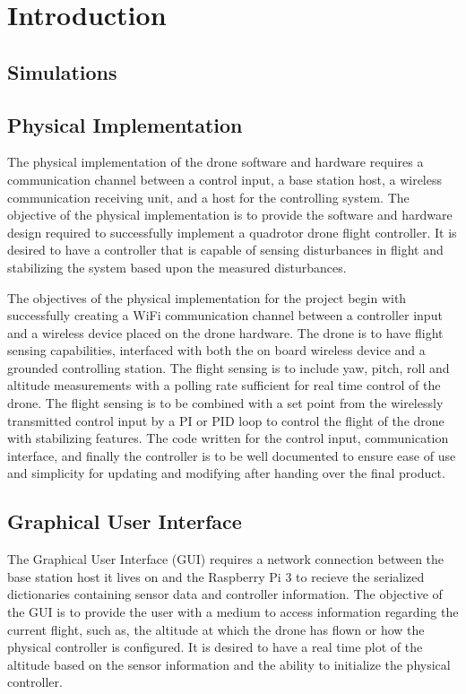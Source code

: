 
\section{Introduction}
\subsection{Simulations}

\subsection{Physical Implementation}


The physical implementation of the drone software and hardware requires a communication channel between a control input, a base station host, a wireless communication receiving unit, and a host for the controlling system. The objective of the physical implementation is to provide the software and hardware design required to successfully implement a quadrotor drone flight controller. It is desired to have a controller that is capable of sensing disturbances in flight and stabilizing the system based upon the measured disturbances.

The objectives of the physical implementation for the project begin with successfully creating a WiFi communication channel between a controller input and a wireless device placed on the drone hardware. The drone is to have flight sensing capabilities, interfaced with both the on board wireless device and a grounded controlling station. The flight sensing is to include yaw, pitch, roll and altitude measurements with a polling rate sufficient for real time control of the drone. The flight sensing is to be combined with a set point from the wirelessly transmitted control input by a PI or PID loop to control the flight of the drone with stabilizing features. The code written for the control input, communication interface, and finally the controller is to be well documented to ensure ease of use and simplicity for updating and modifying after handing over the final product.


\subsection{Graphical User Interface}


The Graphical User Interface (GUI) requires a network connection between the base station host it lives on and the Raspberry Pi 3 to recieve the serialized dictionaries containing sensor data and controller information. The objective of the GUI is to provide the user with a medium to access information regarding the current flight, such as, the altitude at which the drone has flown or how the physical controller is configured. It is desired to have a real time plot of the altitude based on the sensor information and the ability to initialize the physical controller. 

